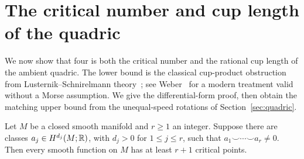 \section{The critical number and cup length of the quadric}
\label{sec:critical-bound}

We now show that four is both the critical number and the rational cup
length of the ambient quadric. The lower bound is the classical
cup-product obstruction from Lusternik--Schnirelmann
theory~\cite{LusternikSchnirelmann1934}; see
Weber~\cite[Theorems~3.5 and 3.6]{Weber2019} for a modern treatment
valid without a Morse assumption. We give the differential-form proof,
then obtain the matching upper bound from the unequal-speed rotations
of Section~\ref{sec:quadric}.

\begin{lemma}\label{lem:critical-bound}
Let $M$ be a closed smooth manifold and $r\ge1$ an integer. Suppose there are classes
$a_j\in H^{d_j}(M;\mathbb R)$, with $d_j>0$ for $1\le j\le r$, such that
$a_1\smile\cdots\smile a_r\ne0$. Then every smooth function on $M$
has at least $r+1$ critical points.
\end{lemma}

